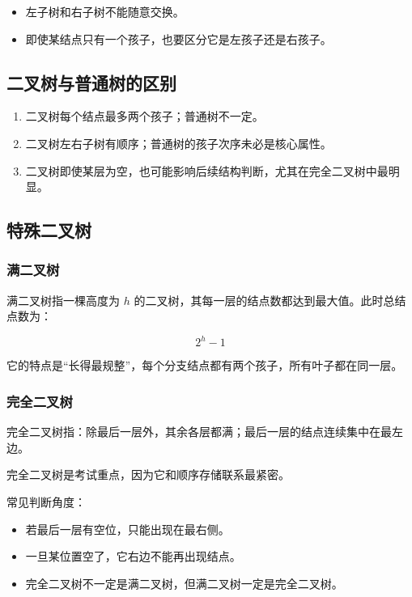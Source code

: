 \documentclass{../../note}
\begin{document}
\begin{itemize}
  \item 左子树和右子树不能随意交换。
  \item 即使某结点只有一个孩子，也要区分它是左孩子还是右孩子。
\end{itemize}

\subsection{二叉树与普通树的区别}

\begin{enumerate}
  \item 二叉树每个结点最多两个孩子；普通树不一定。
  \item 二叉树左右子树有顺序；普通树的孩子次序未必是核心属性。
  \item 二叉树即使某层为空，也可能影响后续结构判断，尤其在完全二叉树中最明显。
\end{enumerate}

\subsection{特殊二叉树}

\subsubsection{满二叉树}

满二叉树指一棵高度为 $h$ 的二叉树，其每一层的结点数都达到最大值。此时总结点数为：

\[
2^h - 1
\]

它的特点是“长得最规整”，每个分支结点都有两个孩子，所有叶子都在同一层。

\subsubsection{完全二叉树}

完全二叉树指：除最后一层外，其余各层都满；最后一层的结点连续集中在最左边。

完全二叉树是考试重点，因为它和顺序存储联系最紧密。

常见判断角度：

\begin{itemize}
  \item 若最后一层有空位，只能出现在最右侧。
  \item 一旦某位置空了，它右边不能再出现结点。
  \item 完全二叉树不一定是满二叉树，但满二叉树一定是完全二叉树。
\end{itemize}
\end{document}
